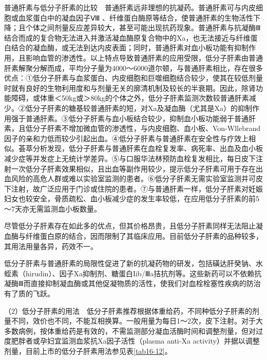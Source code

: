 普通肝素与低分子肝素的比较　普通肝素远非理想的抗凝药。普通肝素可与内皮细胞或血浆蛋白中的凝血因子Ⅷ
、纤维蛋白酶原等结合，使普通肝素的生物活性下降；且个体之间剂量反应差异较大，甚至可能出现抗药现象。普通肝素与抗凝酶Ⅲ结合而成的复合物无法进入并激活凝血酶原复合物中的Xa，也无法接近与纤维蛋白结合的凝血酶，或无法到达内皮表面；同时，普通肝素对血小板功能有抑制作用，且影响血管的渗透性。以上特点导致普通肝素的应用受限，低分子肝素由普通肝素解聚分解而成，平均分子量为4000～6000道尔顿，与普通肝素相比，存在很多优点：①低分子肝素与血浆蛋白、内皮细胞和巨噬细胞结合较少，使其在较低剂量时就有良好的生物利用度和与剂量无关的廓清机制及较长的半衰期。因此，除肾功能障碍，或体重＜50kg或＞80kg的个体之外，低分子肝素监测次数较普通肝素减少。②低分子肝素的糖基较普通肝素的短，对Xa及凝血酶（尤其是Xa）的抑制作用强于普通肝素。③低分子肝素与血小板结合较少，抑制血小板功能弱于普通肝素，且低分子肝素不增加微血管的渗透性，与内皮细胞、血小板、Von-Wllebrand因子的亲和力低而较少引起出血。④低分子肝素与普通肝素在安全性与疗效上相似。荟萃分析发现，低分子肝素与普通肝素在血栓复发率、病死率、出血及血小板减少症等并发症上无统计学差异。⑤与口服华法林预防血栓复发相比，每日皮下注射一次低分子肝素效果相似，且出血等副作用较少，提示低分子肝素可用于存在出血风险的高危人群或难以实验室监测的患者。⑥低分子肝素无需实验室监测并可皮下注射，故广泛应用于门诊或住院的患者。⑦与普通肝素一样，低分子肝素对妊娠妇女也较安全，骨质疏松、血小板减少症的发生率较低，在应用低分子肝素的前5～7天亦无需监测血小板数量。

尽管低分子肝素存在如此多的优点，但其价格昂贵，且低分子肝素同样无法阻止凝血酶与纤维蛋白原的结合，因而限制了其临床应用。目前低分子肝素的品种较多，其用法用量各异，药效不一。

低分子肝素与普通肝素的局限性促进了新的抗凝药物的研发，包括磺达肝癸钠、水蛭素（hirudin）、因子Xa抑制剂、糖蛋白Iib/Ⅲa拮抗剂等。这些新药可以不依赖抗凝酶Ⅲ而直接抑制凝血酶或其他促凝物质的活性，使我们对血栓栓塞性疾病的防治有了质的飞跃。

（2）低分子肝素的用法　低分子肝素推荐根据体重给药，不同种低分子肝素的剂量不同，效价也不同，不能互相换算。一般用量为每日1～2次，皮下注射。对于大多数病例，按体重给药是有效的，不需监测部分凝血活酶时间和调整剂量，但对过度肥胖者或孕妇宜监测血浆抗Xa因子活性（plasma
anti-Xa activity）并据以调整剂量，目前上市的低分子肝素用法参见表\ref{tab16-12}。


